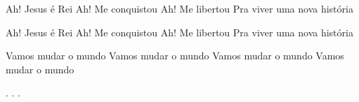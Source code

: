 Ah! Jesus é Rei
Ah! Me conquistou
Ah! Me libertou
Pra viver uma nova história

Ah! Jesus é Rei
Ah! Me conquistou
Ah! Me libertou
Pra viver uma nova história

Vamos mudar o mundo
Vamos mudar o mundo
Vamos mudar o mundo
Vamos mudar o mundo


\beginverse*
.
.
.
\endverse
\begin{comment}
\lstset{basicstyle=\scriptsize\bf} %
\tab{Solo 1}
\begin{lstlisting}
E|-----------------------------------------------------|
B|-----------------------------------------------------|
G|-----------------------------------------------------|
D|-----------------------------------------------------|
A|-----------------------------------------------------|
E|-----------------------------------------------------|
\end{lstlisting}
\end{comment}
\vspace{2em} 
% 
% 
% 
% 
\endsong
\begin{comment}

\end{comment}